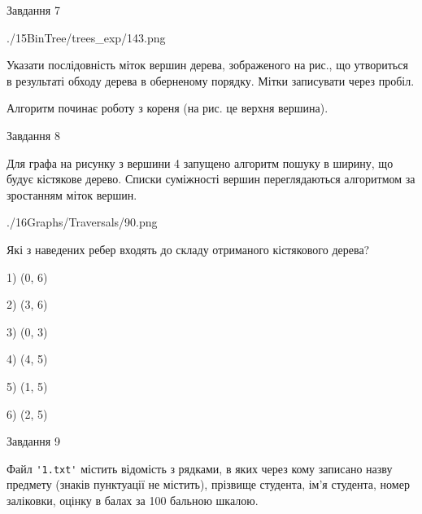 \documentclass[12pt, ukrainian]{article}
\def\code#1{\Verb!#1!}
\begin{document}
{\vspace{10mm}\par

\newpage
\begin{minipage}[t]{9.7cm}
               
{\begin{center}Завдання {7}\end{center}}
\vspace{-6mm}

\begin{center}
	{./15BinTree/trees_exp/143.png}
\end{center}
Указати послідовність міток вершин дерева, зображеного на рис., що утвориться в результаті обходу дерева в оберненому порядку. Мітки записувати через пробіл.\par Алгоритм починає роботу з кореня (на рис. це верхня вершина).\par

\end{minipage}
\vline \hspace{8mm}
\begin{minipage}[t]{8.0cm}
               
{\begin{center}Завдання {8}\end{center}}
\vspace{-6mm}
Для графа на рисунку з вершини 4 запущено алгоритм пошуку в ширину, що будує кістякове дерево. Списки суміжності вершин переглядаються алгоритмом за зростанням міток вершин.\par
\begin{center}
	{./16Graphs/Traversals/90.png}
\end{center}
\par Які з наведених ребер входять до складу отриманого кістякового дерева?\par
1) (0, 6)\par
2) (3, 6)\par
3) (0, 3)\par
4) (4, 5)\par
5) (1, 5)\par
6) (2, 5)\par
{\vskip 15pt} \par

\end{minipage}

               
{\begin{center}Завдання {9}\end{center}}
\vspace{-6mm}
Файл \code{'1.txt'} містить відомість з рядками, в яких через кому записа\-но назву предмету (знаків пунктуації не містить), прізвище студента, ім'я студента, номер залі\-ков\-ки, оцінку в балах за 100 бальною шкалою.

}
\end{document}
